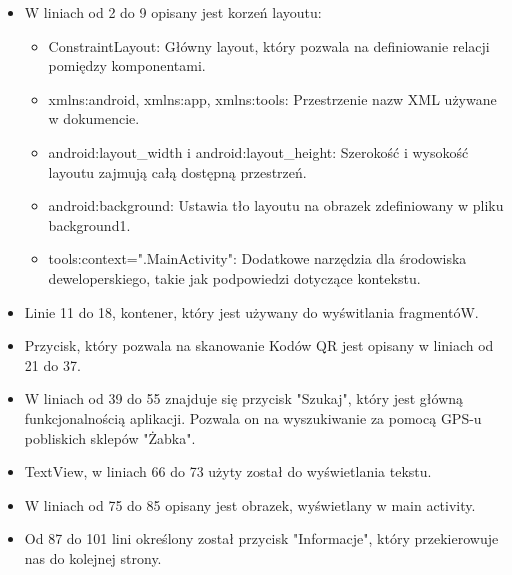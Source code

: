 \begin{itemize}
	\item W liniach od 2 do 9 opisany jest korzeń layoutu:
	\begin{itemize}
		\item ConstraintLayout: Główny layout, który pozwala na definiowanie relacji pomiędzy komponentami.
		\item xmlns:android, xmlns:app, xmlns:tools: Przestrzenie nazw XML używane w dokumencie.
		\item android:layout\_width i android:layout\_height: Szerokość i wysokość layoutu zajmują całą dostępną przestrzeń.
		\item android:background: Ustawia tło layoutu na obrazek zdefiniowany w pliku background1.
		\item tools:context=".MainActivity": Dodatkowe narzędzia dla środowiska deweloperskiego, takie jak podpowiedzi dotyczące kontekstu.
	\end{itemize}
	\item Linie 11 do 18, kontener, który jest używany do wyświtlania fragmentóW.
	\item Przycisk, który pozwala na skanowanie Kodów QR jest opisany w liniach od 21 do 37.
	\item W liniach od 39 do 55 znajduje się przycisk "Szukaj", który jest główną funkcjonalnością aplikacji. Pozwala on na wyszukiwanie za pomocą GPS-u pobliskich sklepów "Żabka".
	\item TextView, w liniach 66 do 73 użyty został do wyświetlania tekstu.
	\item W liniach od 75 do 85 opisany jest obrazek, wyświetlany w main activity.
	\item Od 87 do 101 lini określony został przycisk "Informacje", który przekierowuje nas do kolejnej strony.
\end{itemize}
